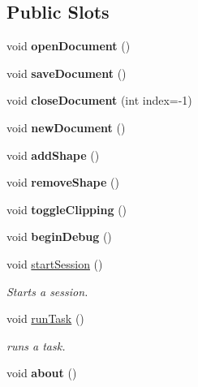 \subsection*{Public Slots}
\begin{DoxyCompactItemize}
\item 
\hypertarget{class_main_window_a2a369ca87439ec2451edff17f94dd245}{void {\bfseries open\-Document} ()}\label{class_main_window_a2a369ca87439ec2451edff17f94dd245}

\item 
\hypertarget{class_main_window_ace97ff3002e26b7e851e44c27bf4feb1}{void {\bfseries save\-Document} ()}\label{class_main_window_ace97ff3002e26b7e851e44c27bf4feb1}

\item 
\hypertarget{class_main_window_a252ad8561a072e1b986842e78818ea09}{void {\bfseries close\-Document} (int index=-\/1)}\label{class_main_window_a252ad8561a072e1b986842e78818ea09}

\item 
\hypertarget{class_main_window_a3598b641eda59f12e6ed53c0a39b6ae0}{void {\bfseries new\-Document} ()}\label{class_main_window_a3598b641eda59f12e6ed53c0a39b6ae0}

\item 
\hypertarget{class_main_window_ac4ebdf2c1008b8b1e2312fb15dd26374}{void {\bfseries add\-Shape} ()}\label{class_main_window_ac4ebdf2c1008b8b1e2312fb15dd26374}

\item 
\hypertarget{class_main_window_ab3b7aa3db44ca899a57eeafa3aa90d11}{void {\bfseries remove\-Shape} ()}\label{class_main_window_ab3b7aa3db44ca899a57eeafa3aa90d11}

\item 
\hypertarget{class_main_window_aa2a6bc69d6062689931055fad28b9048}{void {\bfseries toggle\-Clipping} ()}\label{class_main_window_aa2a6bc69d6062689931055fad28b9048}

\item 
\hypertarget{class_main_window_a00f623c134f2421a8ae5e097bc704026}{void {\bfseries begin\-Debug} ()}\label{class_main_window_a00f623c134f2421a8ae5e097bc704026}

\item 
void \hyperlink{class_main_window_ae4b78713e2b3d9b1fe8544029cc32e60}{start\-Session} ()
\begin{DoxyCompactList}\small\item\em Starts a session. \end{DoxyCompactList}\item 
void \hyperlink{class_main_window_a843c6d6362c897099c43ad2d65352d5d}{run\-Task} ()
\begin{DoxyCompactList}\small\item\em runs a task. \end{DoxyCompactList}\item 
\hypertarget{class_main_window_a7be6a5d98970ac1a6296c6f9aee1e9bb}{void {\bfseries about} ()}\label{class_main_window_a7be6a5d98970ac1a6296c6f9aee1e9bb}

\end{DoxyCompactItemize}
